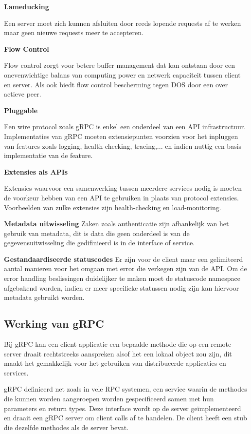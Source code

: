 \textbf{Lameducking}

Een server moet zich kunnen afsluiten door reeds lopende requests af te werken maar geen nieuwe requests meer te accepteren.

\textbf{Flow Control}

Flow control zorgt voor betere buffer management dat kan ontstaan door een onevenwichtige balans van computing power en netwerk capaciteit tussen client en server. Als ook biedt flow control bescherming tegen DOS door een over actieve peer.

\textbf{Pluggable}

Een wire protocol zoals gRPC is enkel een onderdeel van een API infrastructuur. Implementaties van gRPC moeten extensiepunten voorzien voor het inpluggen van features zoals logging, health-checking, tracing,... en indien nuttig een basis implementatie van de feature.

\textbf{Extensies als APIs}

Extensies waarvoor een samenwerking tussen meerdere services nodig is moeten de voorkeur hebben van een API te gebruiken in plaats van protocol extensies. Voorbeelden van zulke extensies zijn health-checking en load-monitoring.

\textbf{Metadata uitwisseling}
Zaken zoals authenticatie zijn afhankelijk van het gebruik van metadata, dit is data die geen onderdeel is van de gegevensuitwisseling die gedifinieerd is in de interface of service.

\textbf{Gestandaardiseerde statuscodes}
Er zijn voor de client maar een gelimiteerd aantal manieren voor het omgaan met error die verkegen zijn van de API. Om de error handling beslissingen duidelijker te maken moet de statuscode namespace afgebakend worden, indien er meer specifieke statussen nodig zijn kan hiervoor metadata gebruikt worden.

\subsection{Werking van gRPC}
\label{subsec: Werking van gRPC}

Bij gRPC kan een client applicatie een bepaalde methode die op een remote server draait rechtstreeks aanspreken alsof het een lokaal object zou zijn, dit maakt het gemakkelijk voor het gebruiken van distribueerde applicaties en services.

gRPC definieerd net zoals in vele RPC systemen, een service waarin de methodes die kunnen worden aangeroepen worden gespecificeerd samen met hun parameters en return types. Deze interface wordt op de server geïmplementeerd en draait een gRPC server om client calls af te handelen. De client heeft een stub die dezelfde methodes als de server bevat.


